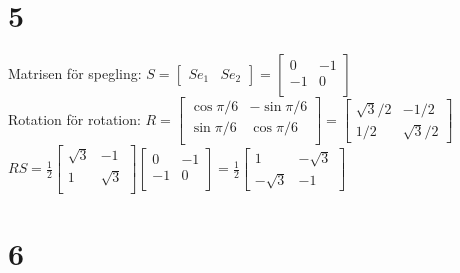 \documentclass{article}
\begin{document}
\section*{5}
Matrisen för spegling:
$
S = 
\begin{bmatrix}
    Se_{1} & Se_{2}
\end{bmatrix}
=
\begin{bmatrix}
    0 & -1 \\
    -1 & 0 \\
\end{bmatrix}
$
\\
Rotation för rotation:
$
R = 
\begin{bmatrix}
    \cos{\pi/6} & -\sin{\pi/6} \\
    \sin{\pi/6} & \cos{\pi/6} \\
\end{bmatrix}
=
\begin{bmatrix}
    \sqrt{3}/2 & -1/2 \\
    1/2 & \sqrt{3}/2
\end{bmatrix}
$
\\
$
RS = 
\frac{1}{2}
    \begin{bmatrix}
        \sqrt{3} & -1 \\
        1   & \sqrt{3} \\
    \end{bmatrix}
    \begin{bmatrix}
        0   &   -1 \\
        -1  &   0  \\
    \end{bmatrix}
=
\frac{1}{2}
    \begin{bmatrix}
        1   &   -\sqrt{3} \\
        -\sqrt{3} & -1
    \end{bmatrix}
$

\section*{6}
\end{document}
